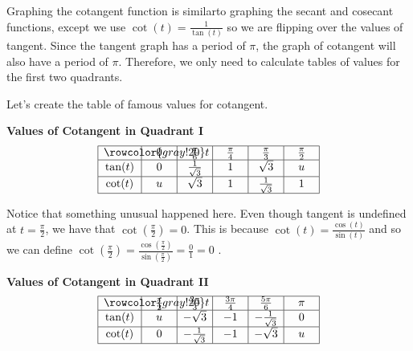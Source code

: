\documentclass[nooutcomes, noauthor]{ximera}
\begin{document}
Graphing the cotangent function is similarto graphing the secant and cosecant functions, except we use $\cot(t)=\frac{1}{\tan(t)}$ so we are flipping over the values of tangent.  Since the tangent graph has a period of $\pi$, the graph of cotangent will also have a period of $\pi$.  Therefore, we only need to calculate tables of values for the first two quadrants.

Let's create the table of famous values for cotangent.

\begin{center}
\textbf{Values of Cotangent in Quadrant I}
\renewcommand*{\arraystretch}{2.5}
\setlength{\arrayrulewidth}{0.5mm}
\setlength{\tabcolsep}{18pt}
\[
\begin{array}{|>{\centering\arraybackslash$} p{1cm} <{$} | >{\centering\arraybackslash$} p{.75cm} <{$} |  >{\centering\arraybackslash$} p{.75cm} <{$} |  >{\centering\arraybackslash$} p{.75cm} <{$} |  >{\centering\arraybackslash$} p{.75cm} <{$} |  >{\centering\arraybackslash$} p{.75cm} <{$} |}
\hline 
\rowcolor{gray!20}
t & 0 & \frac{\pi}{6} & \frac{\pi}{4} & \frac{\pi}{3} & \frac{\pi}{2}\\
\hline
\tan(t) & 0 & \frac{1}{\sqrt{3}} &1 & \sqrt{3} & u\\
\hline
\cot(t) & u & \sqrt{3} & 1 & \frac{1}{\sqrt{3}}& 1\\
\hline 
\end{array}
\]
\end{center}

Notice that something unusual happened here.  Even though tangent is undefined at $t=\frac{\pi}{2}$, we have that $\cot(\frac{\pi}{2})=0$.  This is because $\cot(t)=\frac{\cos(t)}{\sin(t)}$ and so we can define $\cot(\frac{\pi}{2})=\frac{\cos(\frac{\pi}{2})}{\sin(\frac{\pi}{2})}=\frac{0}{1}=0$ .

\begin{center}
\textbf{Values of Cotangent in Quadrant II}
\renewcommand*{\arraystretch}{2.5}
\setlength{\arrayrulewidth}{0.5mm}
\setlength{\tabcolsep}{18pt}
\[
\begin{array}{|>{\centering\arraybackslash$} p{1cm} <{$} | >{\centering\arraybackslash$} p{.75cm} <{$} |  >{\centering\arraybackslash$} p{.75cm} <{$} |  >{\centering\arraybackslash$} p{.75cm} <{$} |  >{\centering\arraybackslash$} p{.75cm} <{$} |  >{\centering\arraybackslash$} p{.75cm} <{$} |}
\hline 
\rowcolor{gray!20}
t & \frac{\pi}{2} & \frac{2\pi}{3} & \frac{3\pi}{4} & \frac{5\pi}{6} & \pi\\
\hline
\tan(t) & u & -\sqrt{3} & -1 & -\frac{1}{\sqrt{3}} & 0\\
\hline
\cot(t) & 0 & -\frac{1}{\sqrt{3}}& -1 & -\sqrt{3} & u\\
\hline 
\end{array}
\]
\end{center}
\end{document}
